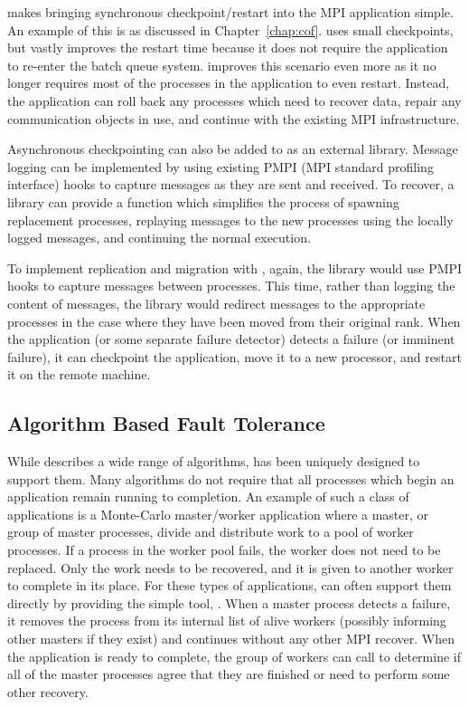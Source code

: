 \ulfm makes bringing synchronous checkpoint/restart into the MPI application 
simple. An example of this is \cof as discussed in Chapter~\ref{chap:cof}. \cof 
uses small checkpoints, but vastly improves the restart time because it does not 
require the application to re-enter the batch queue system. \ulfm improves this 
scenario even more as it no longer requires most of the processes in the 
application to even restart. Instead, the application can roll back any processes 
which need to recover data, repair any communication objects in use, and continue 
with the existing MPI infrastructure.

Asynchronous checkpointing can also be added to \ulfm as an external library. 
Message logging can be implemented by using existing PMPI (MPI standard profiling interface) hooks to capture 
messages as they are sent and received. To recover, a library can provide a 
function which simplifies the process of spawning replacement processes, 
replaying messages to the new processes using the locally logged messages, and 
continuing the normal execution.

To implement replication and migration with \ulfm, again, the library would use 
PMPI hooks to capture messages between processes. This time, rather than logging 
the content of messages, the library would redirect messages to the appropriate 
processes in the case where they have been moved from their original rank. When 
the application (or some separate failure detector) detects a failure (or 
imminent failure), it can checkpoint the application, move it to a new processor, 
and restart it on the remote machine.

\subsection{Algorithm Based Fault Tolerance}
\label{subsec:apps:types:abft}

While \abft describes a wide range of algorithms, \ulfm has been uniquely 
designed to support them. Many \abft algorithms do not require that all processes 
which begin an application remain running to completion. An example of such a 
class of applications is a Monte-Carlo master/worker application where a master, 
or group of master processes, divide and distribute work to a pool of worker 
processes. If a process in the worker pool fails, the worker does not need to be 
replaced. Only the work needs to be recovered, and it is given to another worker 
to complete in its place. For these types of applications, \ulfm can often 
support them directly by providing the simple tool, . 
When a master process detects a failure, it removes the process from its internal 
list of alive workers (possibly informing other masters if they exist) and 
continues without any other MPI recover. When the application is ready to 
complete, the group of workers can call  to determine 
if all of the master processes agree that they are finished or need to perform 
some other recovery.

